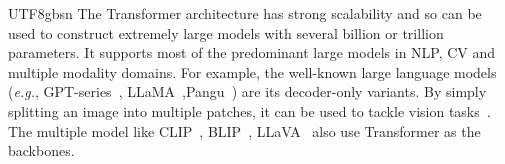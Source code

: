 \documentclass[10pt,journal,compsoc]{IEEEtran}
\newcommand{\eg}{\emph{e.g.}}
\newcommand{\etal}{\emph{et al.}}
\newcommand{\<}{\left\langle}
\renewcommand{\>}{\right\rangle}
\newcommand{\1}{\mathbbm{1}}
\begin{document}
\begin{CJK}{UTF8}{gbsn}
The Transformer architecture has strong scalability and so can be used to construct extremely large models with several billion or trillion parameters. It  supports most of the predominant large models in NLP, CV and multiple modality domains. For example, the well-known large language models (\eg, GPT-series~\cite{brown2020language,gpt4}, LLaMA~\cite{touvron2023llama},Pangu~\cite{zeng2021pangu,ren2023pangu}) are its decoder-only variants. By simply splitting an image into multiple patches, it can be used to tackle vision tasks~\cite{Dosovitskiy2020AnII,chen2021pre,bai2023sequential}. The multiple model like CLIP~\cite{radford2021learning}, BLIP~\cite{li2022blip}, LLaVA~\cite{liu2023visual} also use Transformer as the backbones. 




\begin{table}[htb]
	\centering
	\renewcommand\arraystretch{1.0}
	\caption{Representative compression method for Transformer models.}
	\label{tab:overview}
	\footnotesize
\end{table}
\end{CJK}
\end{document}
